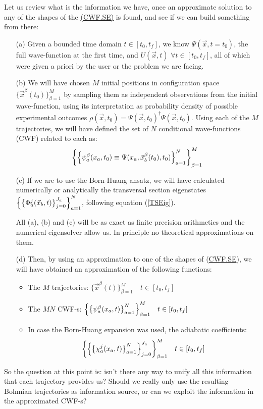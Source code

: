 \documentclass[11pt, a4paper]{article} %
\begin{document}
Let us review what is the information we have, once an approximate solution to any of the shapes of the \hyperref[CWF.SE]{(CWF.SE)} is found, and see if we can build something from there:
\begin{enumerate}
\item[(a)] Given a bounded time domain $t\in [t_0,t_f]$, we know $\Psi(\vec{x},t=t_0)$, the full wave-function at the first time, and $U(\vec{x},t)$ $\forall t\in[t_0,t_f]$, all of which were given a priori by the user or the problem we are facing.

\item[(b)] We will have chosen $M$ initial positions in configuration space $\{\vec{x}^\beta(t_0)\}_{\beta=1}^M$ by sampling them as independent observations from the initial wave-function, using its interpretation as probability density of possible experimental outcomes $\rho(\vec{x},t_0)=\Psi(\vec{x},t_0)^\dagger \Psi(\vec{x},t_0)$. Using each of the $M$ trajectories, we will have defined the set of $N$ conditional wave-functions (CWF) related to each as:
$$
\qty{\qty{ \psi^\beta_a(x_a,t_0)\equiv\Psi(x_a,\vec{x}_b^\beta(t_0),t_0)}_{a=1}^N}_{\beta=1}^M
$$

\item[(c)] If we are to use the Born-Huang ansatz, we will have calculated numerically or analytically the transversal section eigenstates $\qty{ \qty{ \Phi_a^j(\vec{x}_b,t)}_{j=0}^{J_a}}_{a=1}^N$, following equation (\ref{TSEig}).

All (a), (b) and (c) will be as exact as finite precision arithmetics and the numerical eigensolver allow us. In principle no theoretical approximations on them.

\item[(d)] Then, by using an approximation to one of the shapes of (\hyperref[CWF.SE]{CWF.SE}), we will have obtained an approximation of the following functions: \begin{itemize}
\item The $M$ trajectories: $\{\vec{x}^\beta(t)\}_{\beta=1}^M \quad t \in [t_0, t_f]$ 
\item The $MN$ CWF-s: $\qty{\qty{ \psi^\beta_a(x_a,t)}_{a=1}^N}_{\beta=1}^M \quad t \in [t_0, t_f]$ 
\item In case the Born-Huang expansion was used, the adiabatic coefficients: $$\qty{\qty{\qty{ \chi_a^j(x_a,t)}_{a=1}^N}_{j=0}^{J_a}}_{\beta=1}^M \quad t \in [t_0, t_f]$$
\end{itemize}
\end{enumerate}
So the question at this point is: isn't there any way to unify all this information that each trajectory provides us? Should we really only use the resulting Bohmian trajectories as information source, or can we exploit the information in the approximated CWF-s?
\newpage
\end{document}
